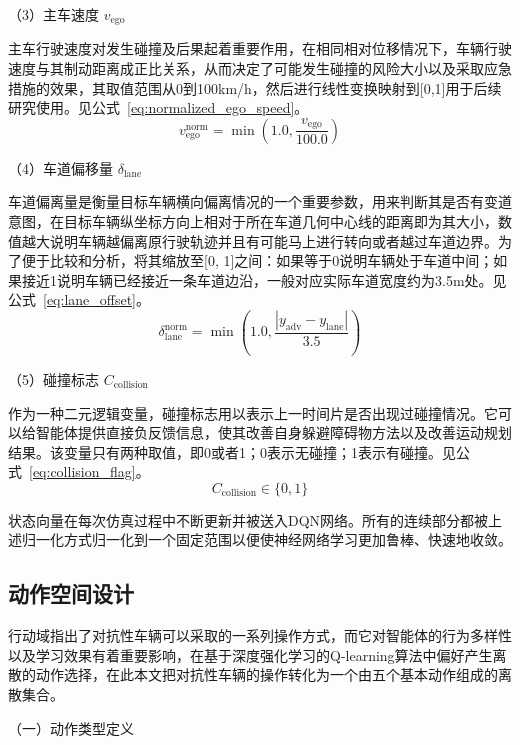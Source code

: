 （3）主车速度 $v_{\text{ego}}$

主车行驶速度对发生碰撞及后果起着重要作用，在相同相对位移情况下，车辆行驶速度与其制动距离成正比关系，从而决定了可能发生碰撞的风险大小以及采取应急措施的效果，其取值范围从0到100km/h，然后进行线性变换映射到[0,1]用于后续研究使用。见公式~\ref{eq:normalized_ego_speed}。
\begin{equation}
v_{\text{ego}}^{\text{norm}} = \min\left(1.0, \frac{v_{\text{ego}}}{100.0}\right)
\label{eq:normalized_ego_speed}
\end{equation}

（4）车道偏移量 $\delta_{\text{lane}}$

车道偏离量是衡量目标车辆横向偏离情况的一个重要参数，用来判断其是否有变道意图，在目标车辆纵坐标方向上相对于所在车道几何中心线的距离即为其大小，数值越大说明车辆越偏离原行驶轨迹并且有可能马上进行转向或者越过车道边界。为了便于比较和分析，将其缩放至[0, 1]之间：如果等于0说明车辆处于车道中间；如果接近1说明车辆已经接近一条车道边沿，一般对应实际车道宽度约为3.5m处。见公式~\ref{eq:lane_offset}。
\begin{equation}
\delta_{\text{lane}}^{\text{norm}} = \min\left(1.0, \frac{|y_{\text{adv}} - y_{\text{lane}}|}{3.5}\right)
\label{eq:lane_offset}
\end{equation}

（5）碰撞标志 $C_{\text{collision}}$

作为一种二元逻辑变量，碰撞标志用以表示上一时间片是否出现过碰撞情况。它可以给智能体提供直接负反馈信息，使其改善自身躲避障碍物方法以及改善运动规划结果。该变量只有两种取值，即0或者1；0表示无碰撞；1表示有碰撞。见公式~\ref{eq:collision_flag}。
\begin{equation}
C_{\text{collision}} \in \{0, 1\}
\label{eq:collision_flag}
\end{equation}

状态向量在每次仿真过程中不断更新并被送入DQN网络。所有的连续部分都被上述归一化方式归一化到一个固定范围以便使神经网络学习更加鲁棒、快速地收敛。
\subsection{动作空间设计}
行动域指出了对抗性车辆可以采取的一系列操作方式，而它对智能体的行为多样性以及学习效果有着重要影响，在基于深度强化学习的Q-learning算法中偏好产生离散的动作选择，在此本文把对抗性车辆的操作转化为一个由五个基本动作组成的离散集合。

（一）动作类型定义

